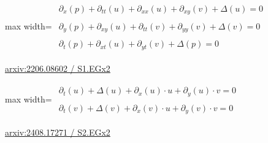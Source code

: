 \documentclass[10pt,a4paper]{article}
\begin{document}
\begin{minipage}{\linewidth}
\begin{center}\begin{adjustbox}{max width=\linewidth}$\displaystyle\begin{gathered}\begin{gathered}\partial_{x}(p)+\partial_{tt}(u)+\partial_{xx}(u)+\partial_{xy}(v)+\Delta(u)=0\end{gathered}\\[5pt]\begin{gathered}\partial_{y}(p)+\partial_{xy}(u)+\partial_{tt}(v)+\partial_{yy}(v)+\Delta(v)=0\end{gathered}\\[5pt]\begin{gathered}\partial_{t}(p)+\partial_{xt}(u)+\partial_{yt}(v)+\Delta(p)=0\end{gathered}\end{gathered}$\end{adjustbox}\end{center}
{\small \href{https://arxiv.org/html/2206.08602#S1.EGx2}{arxiv:2206.08602 / S1.EGx2}}\par
\end{minipage}\par\vspace{7mm}

\begin{minipage}{\linewidth}
\begin{center}\begin{adjustbox}{max width=\linewidth}$\displaystyle\begin{gathered}\begin{gathered}\partial_{t}(u)+\Delta(u)+\partial_{x}(u)\cdot u+\partial_{y}(u)\cdot v=0\end{gathered}\\[5pt]\begin{gathered}\partial_{t}(v)+\Delta(v)+\partial_{x}(v)\cdot u+\partial_{y}(v)\cdot v=0\end{gathered}\end{gathered}$\end{adjustbox}\end{center}
{\small \href{https://arxiv.org/html/2408.17271#S2.EGx2}{arxiv:2408.17271 / S2.EGx2}}\par
\end{minipage}\par\vspace{7mm}
\end{document}
